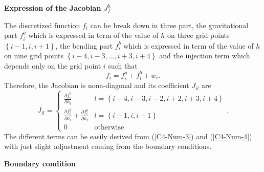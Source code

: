 \vspace{.5cm}    \textbf{Expression   of    the   Jacobian    $J_f^h$}
\vspace{.5cm}

The discretized  function $f_i$ can be  break down in three  part, the
gravitational part $f_i^{g}$  which is expressed in term  of the value
of $h$ on three  grid points $\left\{{i-1,i,i+1}\right\}$, the bending
part $f_i^{b}$ which is expressed in term  of the value of $h$ on nine
grid points  $\left\{{i-4,i-3,...,i+3,i+4}\right\}$ and  the injection
term which depends only on the grid point $i$ such that
\begin{equation}
  f_i = f_i^g+f_i^b+w_i.
\end{equation}
Therefore, the Jacobian is  nona-diagonal and its coefficient $J_{il}$
are
\begin{equation}
  J_{il}=
  \begin{cases}
    \frac{\partial f^{b}_i}{\partial h_{l}} &
    l = \left\{{i-4,i-3,i-2,i+2,i+3,i+4}\right\}\\
    \frac{\partial       f^{g}_i}{\partial       h_{l}}+\frac{\partial
      f^{b}_i}{\partial h_{l}} & l =
    \left\{{i-1,i,i+1}\right\}\\
    0 & \text{otherwise}
  \end{cases}.
  \label{C4-C2-eq12}
\end{equation}
The different  terms can be  easily derived from  (\ref{C4-Num-3}) and
(\ref{C4-Num-4}) with just slight  adjustment coming from the boundary
conditions.

\vspace{.5cm} \textbf{Boundary condition} \vspace{.5cm}

